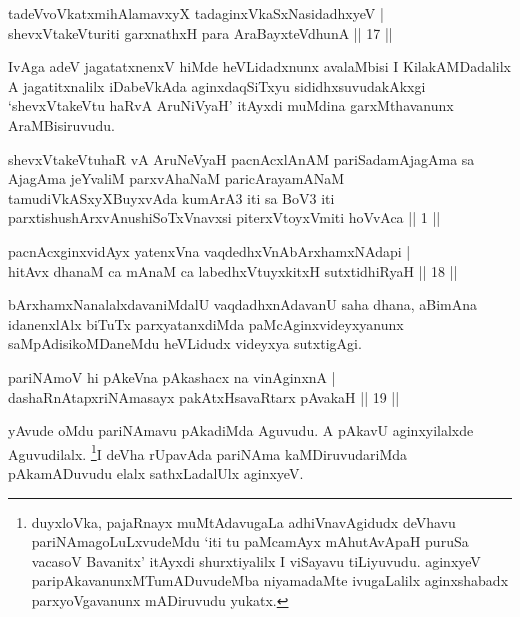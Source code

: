 
\begin{shl}
tadeVvoVkatxmihA\s \s lamavxyX tadaginxVkaSxNasidadhxyeV | \\
shevxVtakeVturiti garxnathxH para AraBayxteV\s dhunA \hfill|| 17 || 
\end{shl}

\begin{artha}
IvAga adeV jagatatxnenxV hiMde heVLidadxnunx avalaMbisi I KilakAMDadalilx A jagatitxnalilx iDabeVkAda aginxdaqSiTxyu sididhxsuvudakAkxgi `shevxVtakeVtu haRvA AruNiVyaH' itAyxdi muMdina garxMthavanunx AraMBisiruvudu.
\end{artha}

\centerline{}

\begin{shl}
shevxVtakeVtuhaR vA AruNeVyaH pacnAcxlAnAM pariSadamAjagAma sa AjagAma jeYvaliM parxvAhaNaM paricArayamANaM tamudiVkASxyXBuyxvAda kumArA3 iti sa BoV3 iti parxtishushArxvAnushiSoTxV\s navxsi piterxVtoyxVmiti hoVvAca || 1 ||
\end{shl}


\begin{shl}
pacnAcxginxvidAyx yatenxVna vaqdedhxVnAbArxhamxNAdapi | \\
hitAvx dhanaM ca mAnaM ca labedhxVtuyxkitxH sutxtidhiRyaH \hfill|| 18 || 
\end{shl}

\begin{artha}
bArxhamxNanalalxdavaniMdalU vaqdadhxnAdavanU saha dhana, aBimAna idanenxlAlx biTuTx parxyatanxdiMda paMcAginxvideyxyanunx saMpAdisikoMDaneMdu heVLidudx videyxya sutxtigAgi.
\end{artha}


\begin{shl}
pariNAmoV hi pAkeVna pAkashacx na vinA\s ginxnA | \\
dashaRnAtapxriNAmasayx pakAtxHsavaRtarx pAvakaH \hfill|| 19 || 
\end{shl}

\begin{artha}
yAvude oMdu pariNAmavu pAkadiMda Aguvudu. A pAkavU aginxyilalxde 
Aguvudilalx. \footnote[1]{duyxloVka, pajaRnayx muMtAdavugaLa 
adhiVnavAgidudx deVhavu pariNAmagoLuLxvudeMdu `iti tu paMcamAyx mAhutAvApaH puruSa vacasoV Bavanitx' itAyxdi 
shurxtiyalilx I viSayavu tiLiyuvudu. aginxyeV 
paripAkavanunxMTumADuvudeMba niyamadaMte ivugaLalilx aginxshabadx 
parxyoVgavanunx mADiruvudu yukatx.}I deVha rUpavAda pariNAma kaMDiruvudariMda 
pAkamADuvudu elalx sathxLadalUlx aginxyeV.
\end{artha}


